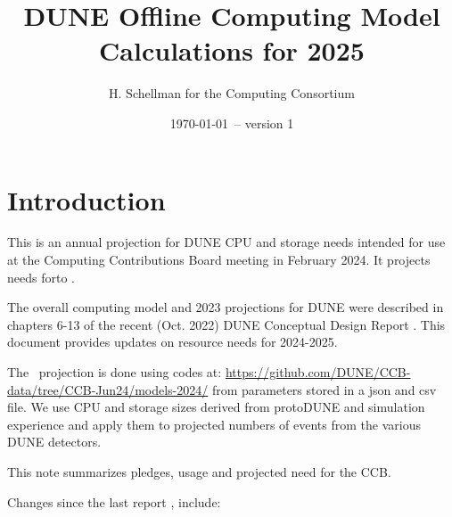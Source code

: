 \documentclass[12pt]{article}
\title{DUNE Offline Computing Model Calculations for 2025}
\author{H. Schellman for the Computing Consortium}
\date{\today\ -- version 1}
\newcommand{\csvautotabularright}[2][]{\csvloop{autotabularright={#2},#1}}
\begin{document}
\makeatletter

\maketitle



\section{Introduction}

This is an annual projection for DUNE CPU and storage needs intended for use at the Computing Contributions Board meeting in February 2024. It projects needs for\configRequestYear to \configMaxYear. 

The overall computing model  and 2023 projections for DUNE were described in chapters 6-13 of the recent (Oct. 2022) DUNE Conceptual Design Report \cite{DUNE:2022fcw}.   This document provides updates on resource needs for 2024-2025. 

The \configRequestYear\ projection is done using codes at: \href{https://github.com/DUNE/CCB-data/tree/CCB-Jun24/models-2024/}{https://github.com/DUNE/CCB-data/tree/CCB-Jun24/models-2024/} from parameters stored in a json and csv file. We use CPU and storage sizes derived from protoDUNE and simulation experience and apply them to projected numbers of events from the various DUNE detectors. 

This note summarizes pledges, usage and projected need for the CCB.






Changes since the last report \cite{CCB2024Report}, \cite{CCB2024Minutes} include:
\end{document}
